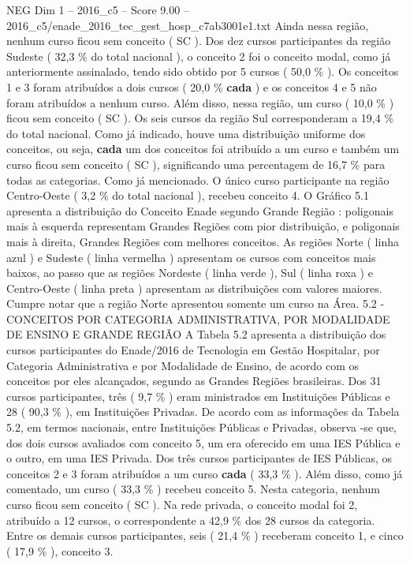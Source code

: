 \begin{textsample}{NEG Dim 1 – 2016\_c5 – Score 9.00 – 2016\_c5/enade\_2016\_tec\_gest\_hosp\_c7ab3001e1.txt}
Ainda nessa região, nenhum curso ficou sem conceito ( SC ).
Dos dez cursos participantes da região Sudeste ( 32,3 \% do total nacional ), o conceito 2 foi o conceito modal, como já anteriormente assinalado, tendo sido obtido por 5 cursos ( 50,0 \% ).
Os conceitos 1 e 3 foram atribuídos a dois cursos ( 20,0 \% \textbf{cada} ) e os conceitos 4 e 5 não foram atribuídos a nenhum curso.
Além disso, nessa região, um curso ( 10,0 \% ) ficou sem conceito ( SC ).
Os seis cursos da região Sul corresponderam a 19,4 \% do total nacional.
Como já indicado, houve uma distribuição uniforme dos conceitos, ou seja, \textbf{cada} um dos conceitos foi atribuído a um curso e também um curso ficou sem conceito ( SC ), significando uma percentagem de 16,7 \% para todas as categorias.
Como já mencionado.
O único curso participante na região Centro-Oeste ( 3,2 \% do total nacional ), recebeu conceito 4.
O Gráfico 5.1 apresenta a distribuição do Conceito Enade segundo Grande Região : poligonais mais à esquerda representam Grandes Regiões com pior distribuição, e poligonais mais à direita, Grandes Regiões com melhores conceitos.
As regiões Norte ( linha azul ) e Sudeste ( linha vermelha ) apresentam os cursos com conceitos mais baixos, ao passo que as regiões Nordeste ( linha verde ), Sul ( linha roxa ) e Centro-Oeste ( linha preta ) apresentam as distribuições com valores maiores.
Cumpre notar que a região Norte apresentou somente um curso na Área. 5.2 - CONCEITOS POR CATEGORIA ADMINISTRATIVA, POR MODALIDADE DE ENSINO E GRANDE REGIÃO A Tabela 5.2 apresenta a distribuição dos cursos participantes do Enade/2016 de Tecnologia em Gestão Hospitalar, por Categoria Administrativa e por Modalidade de Ensino, de acordo com os conceitos por eles alcançados, segundo as Grandes Regiões brasileiras.
Dos 31 cursos participantes, três ( 9,7 \% ) eram ministrados em Instituições Públicas e 28 ( 90,3 \% ), em Instituições Privadas.
De acordo com as informações da Tabela 5.2, em termos nacionais, entre Instituições Públicas e Privadas, observa -se que, dos dois cursos avaliados com conceito 5, um era oferecido em uma IES Pública e o outro, em uma IES Privada.
Dos três cursos participantes de IES Públicas, os conceitos 2 e 3 foram atribuídos a um curso \textbf{cada} ( 33,3 \% ).
Além disso, como já comentado, um curso ( 33,3 \% ) recebeu conceito 5.
Nesta categoria, nenhum curso ficou sem conceito ( SC ).
Na rede privada, o conceito modal foi 2, atribuído a 12 cursos, o correspondente a 42,9 \% dos 28 cursos da categoria.
Entre os demais cursos participantes, seis ( 21,4 \% ) receberam conceito 1, e cinco ( 17,9 \% ), conceito 3.

\end{textsample}
